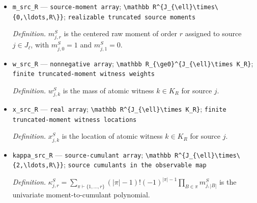 \documentclass{article}
\begin{document}
\begin{itemize}
  \par\smallskip\noindent\emph{Definition.} \(C_{\le R}=(C_2,\ldots,C_R)\).
  \item \texttt{m\_\allowbreak{}src\_\allowbreak{}R} --- \texttt{source-\allowbreak{}moment array}; \texttt{\textbackslash{}\allowbreak{}mathbb R\textasciicircum{}\{J\_\allowbreak{}\{\textbackslash{}\allowbreak{}ell\}\allowbreak{}\textbackslash{}\allowbreak{}times\textbackslash{}\allowbreak{}\{0,\allowbreak{}\textbackslash{}\allowbreak{}ldots,\allowbreak{}R\textbackslash{}\allowbreak{}\}\allowbreak{}\}\allowbreak{}}; \texttt{realizable truncated source moments}
  \par\smallskip\noindent\emph{Definition.} \(m^{S}_{j,r}\) is the centered raw moment of order \(r\) assigned to source \(j\in J_{\ell}\), with \(m^{S}_{j,0}=1\) and \(m^{S}_{j,1}=0\).
  \item \texttt{w\_\allowbreak{}src\_\allowbreak{}R} --- \texttt{nonnegative array}; \texttt{\textbackslash{}\allowbreak{}mathbb R\_\allowbreak{}\{\textbackslash{}\allowbreak{}ge0\}\allowbreak{}\textasciicircum{}\{J\_\allowbreak{}\{\textbackslash{}\allowbreak{}ell\}\allowbreak{}\textbackslash{}\allowbreak{}times K\_\allowbreak{}R\}\allowbreak{}}; \texttt{finite truncated-\allowbreak{}moment witness weights}
  \par\smallskip\noindent\emph{Definition.} \(w^{S}_{j,k}\) is the mass of atomic witness \(k\in K_R\) for source \(j\).
  \item \texttt{x\_\allowbreak{}src\_\allowbreak{}R} --- \texttt{real array}; \texttt{\textbackslash{}\allowbreak{}mathbb R\textasciicircum{}\{J\_\allowbreak{}\{\textbackslash{}\allowbreak{}ell\}\allowbreak{}\textbackslash{}\allowbreak{}times K\_\allowbreak{}R\}\allowbreak{}}; \texttt{finite truncated-\allowbreak{}moment witness locations}
  \par\smallskip\noindent\emph{Definition.} \(x^{S}_{j,k}\) is the location of atomic witness \(k\in K_R\) for source \(j\).
  \item \texttt{kappa\_\allowbreak{}src\_\allowbreak{}R} --- \texttt{source-\allowbreak{}cumulant array}; \texttt{\textbackslash{}\allowbreak{}mathbb R\textasciicircum{}\{J\_\allowbreak{}\{\textbackslash{}\allowbreak{}ell\}\allowbreak{}\textbackslash{}\allowbreak{}times\textbackslash{}\allowbreak{}\{2,\allowbreak{}\textbackslash{}\allowbreak{}ldots,\allowbreak{}R\textbackslash{}\allowbreak{}\}\allowbreak{}\}\allowbreak{}}; \texttt{source cumulants in the observable map}
  \par\smallskip\noindent\emph{Definition.} \(\kappa^{S}_{j,r}=\sum_{\pi\vdash\{1,\ldots,r\}}(|\pi|-1)!(-1)^{|\pi|-1}\prod_{B\in\pi}m^{S}_{j,|B|}\) is the univariate moment-to-cumulant polynomial.

\end{itemize}
\end{document}

